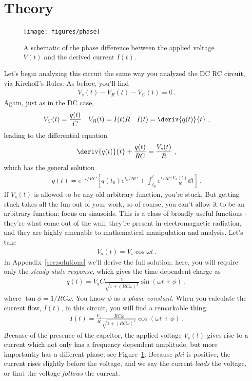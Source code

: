 \documentclass[12pt]{article}
\begin{document}
\section{Theory}
\label{sec:theory}

\begin{figure}
  \centering
  \texttt{[image: figures/phase]}
  \caption{A schematic of the phase difference between the applied
    voltage $V(t)$ and the derived current $I(t)$.}
  \label{fig:phase}
\end{figure}
Let's begin analyzing this circuit the same way you analyzed the DC RC
circuit, via Kirchoff's Rules.  As before, you'll find
\begin{gather*}
  V_s(t) - V_R(t) - V_C(t) = 0\ .
\end{gather*}
Again, just as in the DC case,
\begin{align*}
  V_C(t) &= \frac{q(t)}{C} & V_R(t) &= I(t) R & I(t) =
  \deriv{q(t)}{t}\ ,
\end{align*}
leading to the differential equation
\begin{gather*}
  \deriv{q(t)}{t} + \frac{q(t)}{RC} = \frac{V_s(t)}{R}\ ,
\end{gather*}
which has the general solution
\begin{gather*}
  q(t) = e^{-t/RC} \left[ 
    q(t_0) e^{t_0/RC} + \int_{t_0}^t e^{t/RC} \frac{V_s(t)}{R} \dd t
\right]\ .
\end{gather*}
If $V_s(t)$ is allowed to be any old arbitrary function, you're stuck.
But getting stuck takes all the fun out of your work, so of course,
you can't allow it to be an arbitrary function: focus on sinusoids.
This is a class of broadly useful functions - they're what come out of
the wall, they're present in electromagnetic radiation, and they are
highly amenable to mathematical manipulation and analysis.  Let's take
\begin{gather*}
  V_s(t) = V_s \cos \omega t\ .
\end{gather*}
In Appendix~\ref{sec:solutions} we'll derive the full solution; here,
you will require only the \textit{steady state response}, which gives
the time dependent charge as
\begin{gather*}
  q(t) = V_s C \frac{1}{\sqrt{1+(RC\omega)^2}} \sin( \omega t + \phi)\ ,
\end{gather*}
where $\tan \phi = 1/RC\omega$.  You know $\phi$ as a \textit{phase
  constant}.  When you calculate the current flow, $I(t)$, in this
circuit, you will find a remarkable thing:
\begin{gather*}
  I(t) = \frac{V_s}{R} \frac{RC\omega}{\sqrt{1+(RC\omega)^2}} \cos(
  \omega t + \phi)\ .
\end{gather*}
Because of the presence of the capcitor, the applied voltage $V_s(t)$
gives rise to a current which not only has a frequency dependent
amplitude, but more importantly has a different phase; see
Figure~\ref{fig:phase}.  Because $phi$ is positive, the current rises
slightly before the voltage, and we say the current \textit{leads} the
voltage, or that the voltage \textit{follows} the current.  
\end{document}
